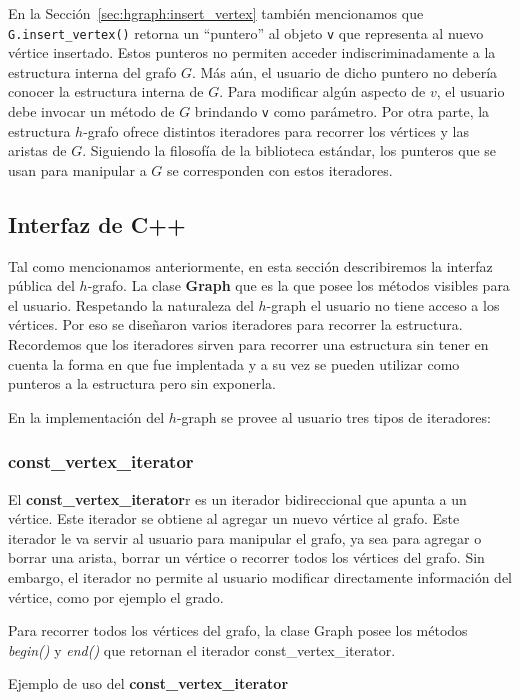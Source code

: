 \documentclass[a4paper,12pt]{article}
\begin{document}
En la Sección~\ref{sec:hgraph:insert_vertex} también mencionamos que \texttt{G.insert\_vertex()} retorna un ``puntero'' al objeto \texttt{v} que representa al nuevo vértice insertado.  Estos punteros no permiten acceder indiscriminadamente a la estructura interna del grafo $G$.  Más aún, el usuario de dicho puntero no debería conocer la estructura interna de $G$.  Para modificar algún aspecto de $v$, el usuario debe invocar un método de $G$ brindando \texttt{v} como parámetro.  Por otra parte, la estructura $h$-grafo ofrece distintos iteradores para recorrer los vértices y las aristas de $G$.  Siguiendo la filosofía de la biblioteca estándar, los punteros que se usan para manipular a $G$ se corresponden con estos iteradores.

\subsection{Interfaz de C++}
\label{sec:c++:interfaz}
Tal como mencionamos anteriormente, en esta sección describiremos la interfaz pública del $h$-grafo.
La clase \textbf{Graph} que es la que posee los métodos visibles para el usuario.
Respetando la naturaleza del $h$-graph el usuario no tiene acceso a los vértices. Por eso se diseñaron varios iteradores para recorrer la estructura.
Recordemos que los iteradores sirven para recorrer una estructura sin tener en cuenta la forma en que fue implentada y a su vez se pueden utilizar como punteros a la estructura pero sin exponerla.

En la implementación del $h$-graph se provee al usuario tres tipos de iteradores:

\subsubsection{const\_vertex\_iterator}
\label{sec:vertex iterator}
El \textbf{const\_vertex\_iterator}r es un iterador bidireccional que apunta a un vértice. Este iterador se obtiene al agregar un nuevo vértice al grafo. Este iterador le va servir al usuario para manipular el grafo, ya sea para agregar o borrar una arista, borrar un vértice o recorrer todos los vértices del grafo. Sin embargo, el iterador no permite al usuario modificar directamente información del vértice, como por ejemplo el grado.

Para recorrer todos los vértices del grafo, la clase Graph posee los métodos \textit{begin()} y \textit{end()} que retornan el iterador const\_vertex\_iterator.

Ejemplo de uso del \textbf{const\_vertex\_iterator}
\end{document}

